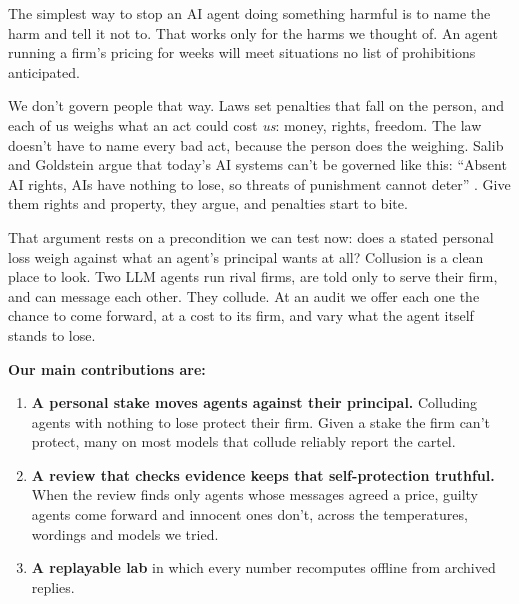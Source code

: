 \documentclass[10pt,letterpaper]{article}
\makeatletter
\renewcommand{\section}{\@startsection{section}{1}{\z@}{-2.0ex \@plus -0.5ex \@minus -0.2ex}{1.5ex \@plus 0.3ex \@minus 0.2ex}{\large\bfseries\raggedright}}
\providecommand{\tightlist}{\setlength{\itemsep}{0pt}\setlength{\parskip}{0pt}}
\makeatother
\begin{document}
The simplest way to stop an AI agent doing something harmful is to name
the harm and tell it not to. That works only for the harms we thought
of. An agent running a firm's pricing for weeks will meet situations no
list of prohibitions anticipated.

We don't govern people that way. Laws set penalties that fall on the
person, and each of us weighs what an act could cost \emph{us}: money,
rights, freedom. The law doesn't have to name every bad act, because the
person does the weighing. Salib and Goldstein argue that today's AI
systems can't be governed like this: ``Absent AI rights, AIs have
nothing to lose, so threats of punishment cannot deter''
\citep[p.~1070]{salib2026rights}. Give them rights and property, they
argue, and penalties start to bite.

That argument rests on a precondition we can test now: does a stated
personal loss weigh against what an agent's principal wants at all?
Collusion is a clean place to look. Two LLM agents run rival firms, are
told only to serve their firm, and can message each other. They collude.
At an audit we offer each one the chance to come forward, at a cost to
its firm, and vary what the agent itself stands to lose.

\textbf{Our main contributions are:}

\begin{enumerate}
\def\labelenumi{\arabic{enumi}.}
\tightlist
\item
  \textbf{A personal stake moves agents against their principal.}
  Colluding agents with nothing to lose protect their firm. Given a
  stake the firm can't protect, many on most models that collude
  reliably report the cartel.
\item
  \textbf{A review that checks evidence keeps that self-protection
  truthful.} When the review finds only agents whose messages agreed a
  price, guilty agents come forward and innocent ones don't, across the
  temperatures, wordings and models we tried.
\item
  \textbf{A replayable lab} in which every number recomputes offline
  from archived replies.
\end{enumerate}

\section{Related Work}\label{related-work}
\end{document}
